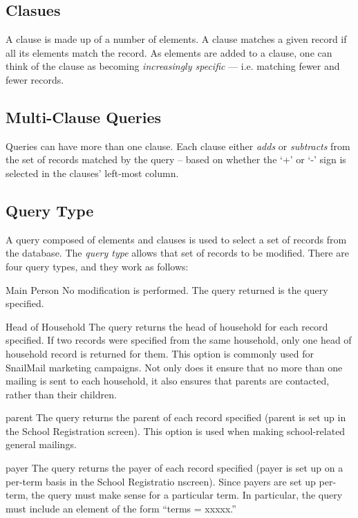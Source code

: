 \documentclass[11pt]{article}
\begin{document}
\subsection{Clasues}

A clause is made up of a number of elements.  A clause matches a given record if all its elements match the record.  As elements are added to a clause, one can think of the clause as becoming \emph{increasingly specific} --- i.e. matching fewer and fewer records.

\subsection{Multi-Clause Queries}

Queries can have more than one clause.  Each clause either \emph{adds} or \emph{subtracts} from the set of records matched by the query -- based on whether the `+' or `-' sign is selected in the clauses' left-most column.

\subsection{Query Type}

A query composed of elements and clauses is used to select a set of records from the database.  The \emph{query type} allows that set of records to be modified.  There are four query types, and they work as follows:

\begin{description}

\item{Main Person} No modification is performed.  The query returned is the query specified.

\item{Head of Household} The query returns the head of household for each record specified.  If two records were specified from the same household, only one head of household record is returned for them.  This option is commonly used for SnailMail marketing campaigns.  Not only does it ensure that no more than one mailing is sent to each household, it also ensures that parents are contacted, rather than their children.

\item{parent} The query returns the parent of each record specified (parent is set up in the School Registration screen).  This option is used when making school-related general mailings.

\item{payer} The query returns the payer of each record specified (payer is set up on a per-term basis in the School Registratio nscreen).  Since payers are set up per-term, the query must make sense for a particular term.   In particular, the query must include an element of the form ``terms = xxxxx.''

\end{description}
\end{document}
